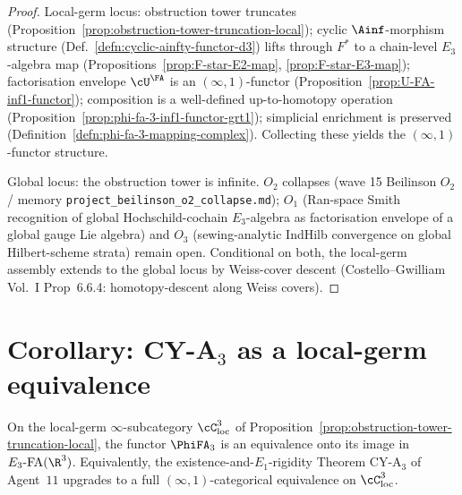 \begin{proof}
Local-germ locus: obstruction tower truncates
(Proposition~\ref{prop:obstruction-tower-truncation-local}); cyclic
$\Ainf$-morphism structure (Def.\ \ref{defn:cyclic-ainfty-functor-d3})
lifts through $F^*$ to a chain-level $E_3$-algebra map
(Propositions~\ref{prop:F-star-E2-map}, \ref{prop:F-star-E3-map});
factorisation envelope $\cU^\FA$ is an $(\infty,1)$-functor
(Proposition~\ref{prop:U-FA-inf1-functor}); composition is a
well-defined up-to-homotopy operation
(Proposition~\ref{prop:phi-fa-3-inf1-functor-grt1}); simplicial
enrichment is preserved
(Definition~\ref{defn:phi-fa-3-mapping-complex}).  Collecting these
yields the $(\infty,1)$-functor structure.

Global locus: the obstruction tower is infinite.  $O_2$ collapses
(wave 15 Beilinson $O_2$ / memory
\texttt{project\_beilinson\_o2\_collapse.md}); $O_1$ (Ran-space Smith
recognition of global Hochschild-cochain $E_3$-algebra as factorisation
envelope of a global gauge Lie algebra) and $O_3$ (sewing-analytic
IndHilb convergence on global Hilbert-scheme strata) remain open.
Conditional on both, the local-germ assembly extends to the global
locus by Weiss-cover descent (Costello--Gwilliam Vol.~I Prop~6.6.4:
homotopy-descent along Weiss covers).
\end{proof}

\section*{Corollary: CY-A$_3$ as a local-germ equivalence}

\begin{corollary}
\label{cor:cy-a3-local-germ-equivalence}
\ClaimStatusProvedHere
On the local-germ $\infty$-subcategory $\cC_{\mathrm{loc}}^3$ of
Proposition~\ref{prop:obstruction-tower-truncation-local}, the
functor $\PhiFA_3$ is an equivalence onto its image in
$E_3\text{-FA}(\R^3)$.  Equivalently, the existence-and-$E_1$-rigidity
Theorem CY-A$_3$ of Agent~$11$ upgrades to a full
$(\infty,1)$-categorical equivalence on $\cC_{\mathrm{loc}}^3$.
\end{corollary}

